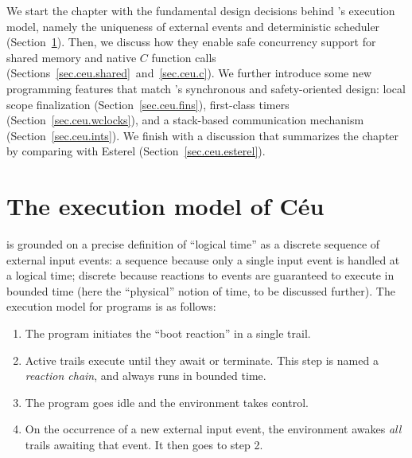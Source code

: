 We start the chapter with the fundamental design decisions behind \CEU's 
execution model, namely the uniqueness of external events and deterministic 
scheduler (Section~\ref{sec.ceu.det}).
Then, we discuss how they enable safe concurrency support for shared memory and 
native $C$ function calls (Sections~\ref{sec.ceu.shared}~and~\ref{sec.ceu.c}).
%
%
We further introduce some new programming features that match \CEU's 
synchronous and safety-oriented design:
local scope finalization (Section~\ref{sec.ceu.fins}),
first-class timers (Section~\ref{sec.ceu.wclocks}),
and a stack-based communication mechanism (Section~\ref{sec.ceu.ints}).
%
We finish with a discussion that summarizes the chapter by comparing \CEU with 
Esterel (Section~\ref{sec.ceu.esterel}).

\section{The execution model of C\'eu}
\label{sec.ceu.det}


\CEU is grounded on a precise definition of ``logical time'' as a discrete 
sequence of external input events:
a sequence because only a single input event is handled at a logical time; 
discrete because reactions to events are guaranteed to execute in bounded time 
(here the ``physical'' notion of time, to be discussed further).
The execution model for \CEU programs is as follows:

\begin{enumerate}
\item The program initiates the ``boot reaction'' in a single trail.
\item Active trails execute until they await or terminate.
      This step is named a \emph{reaction chain}, and always runs in bounded 
      time.
\item The program goes idle and the environment takes control.
\item On the occurrence of a new external input event, the environment awakes 
      \emph{all} trails awaiting that event.
      It then goes to step 2.
\end{enumerate}

